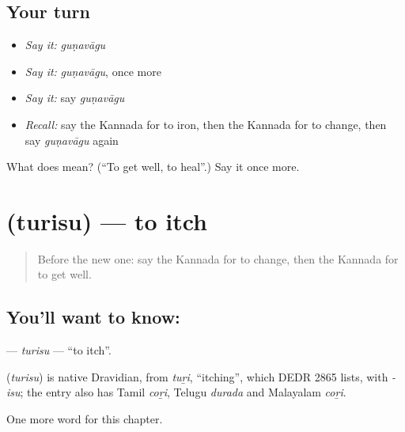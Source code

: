 \subsection*{Your turn}
\begin{itemize}
\raggedright
  \item \emph{Say it:} \emph{guṇavāgu}
  \item \emph{Say it:} \emph{guṇavāgu}, once more
  \item \emph{Say it:} say \emph{guṇavāgu}
  \item \emph{Recall:} say the Kannada for to iron, then the Kannada for to change, then say \emph{guṇavāgu} again
\end{itemize}

\begin{tcolorbox}[breakable,colback=teal!4,colframe=teal!35!black,title={Before you move on}]
What does  mean? (\textquotedblleft{}To get well, to heal\textquotedblright{}.) Say it once more.
\end{tcolorbox}
\section[\texorpdfstring{\kn{ತುರಿಸು} (turisu)}{ತುರಿಸು (turisu)}]{ (turisu) — to itch}

\label{lesson:KA-C200-turisu}



\begin{quote}
Before the new one: say the Kannada for to change, then the Kannada for to get well.
\end{quote}

\subsection*{You'll want to know: }
\textbf{} — \emph{turisu} — \textquotedblleft{}to itch\textquotedblright{}.

\begin{cousinweb}
\textbf{} (\emph{turisu}) is native Dravidian, from \emph{tuṟi}, \textquotedblleft{}itching\textquotedblright{}, which DEDR 2865 lists, with \emph{-isu}; the entry also has Tamil \emph{coṟi}, Telugu \emph{durada} and Malayalam \emph{coṟi}.
\end{cousinweb}

\begin{grammarlens}[title={What you've built}]
One more word for this chapter.
\end{grammarlens}


